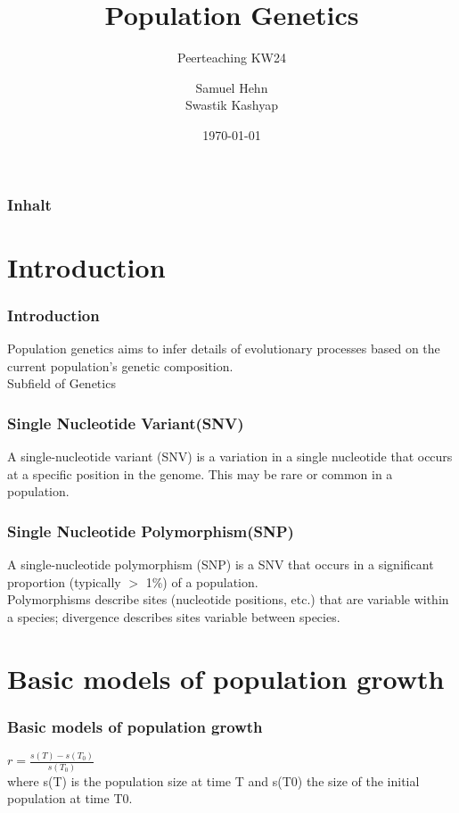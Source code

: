 \documentclass{beamer}
\title{Population Genetics}
\subtitle{Peerteaching KW24}
\author{Samuel Hehn \\ Swastik Kashyap}
\institute{Universität Tübingen}
\date{\today}
\begin{document}
    {
    \begin{frame}
        \titlepage
    \end{frame}
    }

    {
    \begin{frame}
        \frametitle{Inhalt}
        \tableofcontents
    \end{frame}
    }

    \section{Introduction}
        \begin{frame}
            \frametitle{Introduction}
            Population genetics aims to infer details of evolutionary processes based on the current population's genetic composition. \\
            Subfield of Genetics 
        \end{frame}

    \begin{frame}
        \frametitle{Single Nucleotide Variant(SNV)}
        A single-nucleotide variant (SNV) is a variation in a single nucleotide that occurs at a specific position in the genome. This may be rare or common in a population. \\
    \end{frame}

    \begin{frame}
        \frametitle{Single Nucleotide Polymorphism(SNP)}
        A single-nucleotide polymorphism (SNP) is a SNV that occurs in a significant proportion (typically $>$ 1\%) of a population. \\
        Polymorphisms describe sites (nucleotide positions, etc.) that are variable within a species; divergence describes sites variable between species.
    \end{frame}
    
    \section{Basic models of population growth}
    \begin{frame}
        \frametitle{Basic models of population growth}
        $r = \frac{s(T)-s(T_0)}{s(T_0)}$ \\
        where s(T) is the population size at time T and s(T0) the size of the initial population at time T0. 
    \end{frame}
\end{document}
